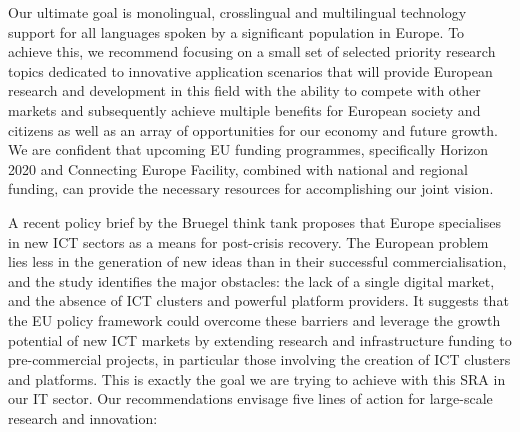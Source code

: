 \documentclass[10pt, plain]{../../metanetpaper}
\begin{document}
\begin{multicols}{2}
Our ultimate goal is monolingual, crosslingual and multilingual technology support for all languages spoken by a significant population in Europe. To achieve this, we recommend focusing on a small set of selected priority research topics dedicated to innovative application scenarios that will provide European research and development in this ﬁeld with the ability to compete with other markets and subsequently achieve multiple beneﬁts for European society and citizens as well as an array of opportunities for our economy and future growth. We are confident that upcoming EU funding programmes, specifically Horizon 2020 and Connecting Europe Facility, combined with national and regional funding, can provide the necessary resources for accomplishing our joint vision.

A recent policy brief by the Bruegel think tank proposes that Europe specialises in new ICT sectors as a means for post-crisis recovery. The European problem lies less in the generation of new ideas than in their successful commercialisation, and the study identifies the major obstacles: the lack of a single digital market, and the absence of ICT clusters and powerful platform providers. It suggests that the EU policy framework could overcome these barriers and leverage the growth potential of new ICT markets by extending research and infrastructure funding to pre-commercial projects, in particular those involving the creation of ICT clusters and platforms. This is exactly the goal we are trying to achieve with this SRA in our IT sector. Our recommendations envisage five lines of action for large-scale research and innovation:


\end{multicols}
\end{document}
